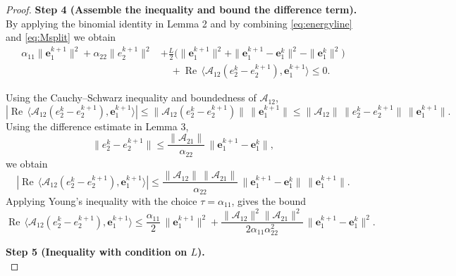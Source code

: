 \documentclass[pdflatex,sn-mathphys-num]{sn-jnl}
\theoremstyle{thmstyleone}%
\theoremstyle{thmstyletwo}%
\theoremstyle{thmstylethree}%
\newcommand{\ip}[2]{\langle #1, #2\rangle}
\newcommand{\Ree}{\operatorname{Re}}
\theoremstyle{definition}
\begin{document}
\begin{proof}[Proof]
		

		\noindent\textbf{Step 4 (Assemble the inequality and bound the difference term).}\\
		\color{black}
		By applying the binomial identity in Lemma \color{black} 2 and by combining \eqref{eq:energyline} and \eqref{eq:Msplit} we obtain
		\begin{align*}
			\alpha_{11}\|\bm{e}_{1}^{k+1}\|^2 + \alpha_{22}\|e_2^{k+1}\|^2
			&+ \tfrac{L}{2}\Big(\|\bm{e}_{1}^{k+1}\|^2 + \|\bm{e}_{1}^{k+1}-\bm{e}_{1}^{k}\|^2 - \|\bm{e}_{1}^{k}\|^2\Big) \\
			&\quad + \Ree\,\ip{\mathcal{A}_{12}(e_2^{k}-e_2^{k+1})}{\bm{e}_{1}^{k+1}}\leq 0.
		\end{align*}
		
		Using the Cauchy--Schwarz inequality and boundedness of $\mathcal{A}_{12}$,
		\[
		|\Ree\,\ip{\mathcal{A}_{12}(e_2^{k}-e_2^{k+1})}{\bm{e}_{1}^{k+1}}|
		\le \|\mathcal{A}_{12}(e_2^{k}-e_2^{k+1})\|\,\|\bm{e}_{1}^{k+1}\|
		\le \|\mathcal{A}_{12}\|\,\|e_2^{k}-e_2^{k+1}\|\,\|\bm{e}_{1}^{k+1}\|.
		\]
		Using the difference estimate in Lemma 3,
		\[
		\|e_2^{k}-e_2^{k+1}\|
		\le \frac{\|\mathcal{A}_{21}\|}{\alpha_{22}}\,\|\bm{e}_{1}^{k+1}-\bm{e}_{1}^{k}\|,
		\]
		we obtain
		\[
		|\Ree\,\ip{\mathcal{A}_{12}(e_2^{k}-e_2^{k+1})}{\bm{e}_{1}^{k+1}}|
		\le \frac{\|\mathcal{A}_{12}\|\,\|\mathcal{A}_{21}\|}{\alpha_{22}}\,
		\|\bm{e}_{1}^{k+1}-\bm{e}_{1}^{k}\|\,\|\bm{e}_{1}^{k+1}\|.
		\]
		Applying Young's inequality with the choice $\tau=\alpha_{11}$,
		gives the bound
		\begin{equation*}%
			\Ree\,\ip{\mathcal{A}_{12}(e_2^{k}-e_2^{k+1})}{\bm{e}_{1}^{k+1}}
			\le \frac{\alpha_{11}}{2}\,\|\bm{e}_{1}^{k+1}\|^2
			+ \frac{\|\mathcal{A}_{12}\|^2 \|\mathcal{A}_{21}\|^2}{2\alpha_{11}\alpha_{22}^2}\,
			\|\bm{e}_{1}^{k+1}-\bm{e}_{1}^{k}\|^2.
		\end{equation*}
		
	

		\noindent\textbf{Step 5 (Inequality with condition on $L$).}\\ 
		

\end{proof}
\end{document}
